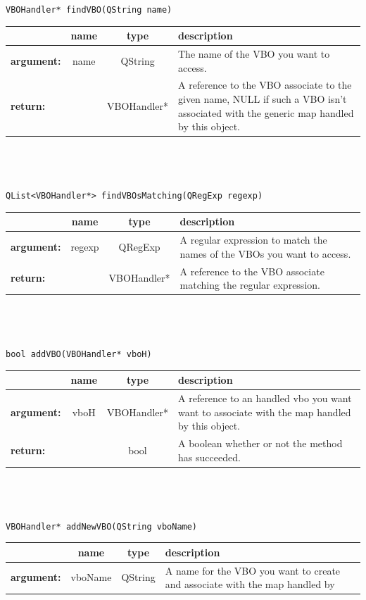 \documentclass[a4paper]{scrreprt}
\begin{document}
	\begin{center}
		\texttt{VBOHandler* findVBO(QString name)}
	\begin{tabular}{|l|c|c|p{}|}
		\hline
		~ & name & type & description
		\\ \hline
		\textbf{argument:} & name & QString &
			The name of the VBO you want to access.
		\\ \hline
		\textbf{return:} & ~ & VBOHandler* &
			A reference to the VBO associate to the given name, NULL if such a VBO isn't
			associated with the generic map handled by this object.
		\\ \hline
	\end{tabular}
	\\~\\~\\
		\texttt{QList<VBOHandler*> findVBOsMatching(QRegExp regexp)}
	\begin{tabular}{|l|c|c|p{}|}
		\hline
		~ & name & type & description
		\\ \hline
		\textbf{argument:} & regexp & QRegExp &
			A regular expression to match the names of the VBOs you want to access.
		\\ \hline
		\textbf{return:} & ~ & VBOHandler* &
			A reference to the VBO associate matching the regular expression.
		\\ \hline
	\end{tabular}
	\\~\\~\\
		\texttt{bool addVBO(VBOHandler* vboH)}
	\begin{tabular}{|l|c|c|p{}|}
		\hline
		~ & name & type & description
		\\ \hline
		\textbf{argument:} &  vboH & VBOHandler* &
			A reference to an handled vbo you want want to associate with the map handled
			by this object.
		\\ \hline
		\textbf{return:} &  ~ & bool &
			A boolean whether or not the method has succeeded.
		\\ \hline
	\end{tabular}
	\\~\\~\\
		\texttt{VBOHandler* addNewVBO(QString vboName)}
	\begin{tabular}{|l|c|c|p{}|}
		\hline
		~ & name & type & description
		\\ \hline
		\textbf{argument:} & vboName & QString &
			A name for the VBO you want to create and associate with the map handled by

\end{tabular}
\end{center}
\end{document}
